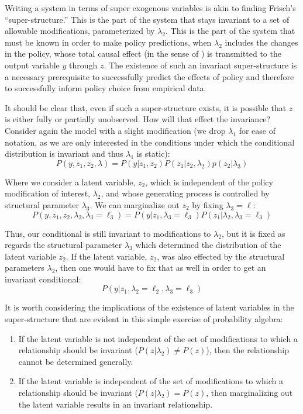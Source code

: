\documentclass[a4paper,12pt]{article}
\begin{document}
Writing a system in terms of super exogenous variables is akin to finding Frisch's ``super-structure.'' This is the part of the system that stays invariant to a set of allowable modifications, parameterized by $\lambda_2$. This is the part of the system that must be known in order to make policy predictions, when $\lambda_2$ includes the changes in the policy, whose total causal effect (in the sense of \cite{Pearl2000}) is transmitted to the output variable $y$ through $z$. The existence of such an invariant super-structure is a necessary prerequisite to successfully predict the effects of policy and therefore to successfully inform policy choice from empirical data.

It should be clear that, even if such a super-structure exists, it is possible that $z$ is either fully or partially unobserved. How will that effect the invariance? Consider again the model with a slight modification (we drop $\lambda_1$ for ease of notation, as we are only interested in the conditions under which the conditional distribution is invariant and thus $\lambda_1$ is static):
%
$$
P(y, z_1, z_2, \lambda) = P(y | z_1, z_2)P(z_1 | z_2, \lambda_2)p(z_2 | \lambda_3)
$$

Where we consider a latent variable, $z_2$, which is independent of the policy modification of interest, $\lambda_2$, and whose generating process is controlled by structural parameter $\lambda_3$. We can marginalize out $z_2$ by fixing $\lambda_3 = \ell$:
%
$$
P(y, z_1, z_2, \lambda_2, \lambda_3 = \ell_3) = P(y | z_1, \lambda_3 = \ell_3)P(z_1 | \lambda_2, \lambda_3 = \ell_3)
$$

Thus, our conditional is still invariant to modifications to $\lambda_2$, but it is fixed as regards the structural parameter $\lambda_3$ which determined the distribution of the latent variable $z_2$. If the latent variable, $z_2$, was also effected by the structural parameters $\lambda_2$, then one would have to fix that as well in order to get an invariant conditional:
%
$$
P(y | z_1, \lambda_2 = \ell_2, \lambda_3 = \ell_3)
$$

It is worth considering the implications of the existence of latent variables in the super-structure that are evident in this simple exercise of probability algebra:

\begin{enumerate}
\item If the latent variable is not independent of the set of modifications to which a relationship should be invariant ($P(z | \lambda_2) \neq P(z)$), then the relationship cannot be determined generally.
\item If the latent variable is independent of the set of modifications to which a relationship should be invariant ($P(z | \lambda_2) = P(z)$, then marginalizing out the latent variable results in an invariant relationship.
\end{enumerate}
\end{document}
